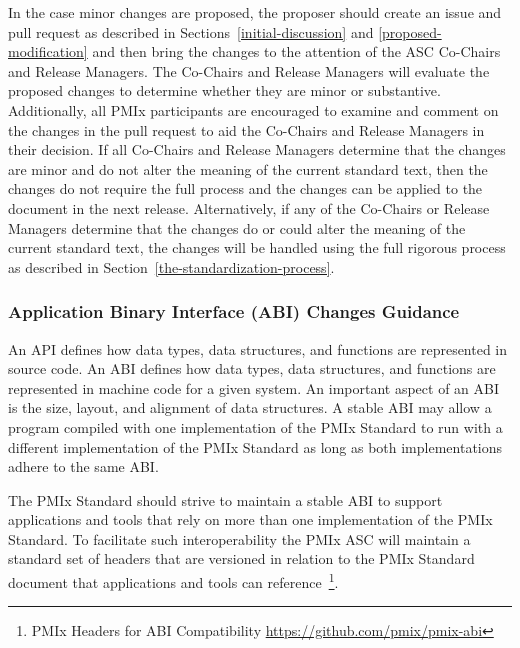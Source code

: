 \documentclass{article}
\begin{document}
In the case minor changes are proposed, the proposer should 
create an issue and pull request as described in Sections~\ref{initial-discussion}
and \ref{proposed-modification} and then bring the
changes to the attention of the ASC Co-Chairs and Release Managers.
The Co-Chairs and Release Managers will evaluate the proposed
changes to determine whether they are minor or substantive.
Additionally, all PMIx participants are encouraged to examine
and comment on the changes in the pull request to aid the
Co-Chairs and Release Managers in their decision.
If all Co-Chairs and Release Managers determine that the
changes are minor and do not alter the meaning of the current standard text, 
then the changes do not require the full process and
the changes can be applied to the document in the next release.
Alternatively, if any of the Co-Chairs or Release Managers determine 
that the changes do or could alter the meaning of the current standard text, 
the changes will be handled using the full rigorous process
as described in Section~\ref{the-standardization-process}.

\hypertarget{abi-changes-guidance}{%
\subsubsection{Application Binary Interface (ABI) Changes Guidance}%
\label{abi-changes-guidance}}

An \acf{API} defines how data types, data structures, and functions are represented in source code.
An \acf{ABI} defines how data types, data structures, and functions are represented in machine code for a given system.
An important aspect of an \ac{ABI} is the size, layout, and alignment of data structures.
A stable \ac{ABI} may allow a program compiled with one implementation of the PMIx Standard to run with a different implementation of the PMIx Standard as long as both implementations adhere to the same \ac{ABI}.

The PMIx Standard should strive to maintain a stable \ac{ABI} to support applications and tools that rely on more than one implementation of the PMIx Standard.
To facilitate such interoperability the PMIx \ac{ASC} will maintain a standard set of headers that are versioned in relation to the PMIx Standard document that applications and tools can reference~\footnote{PMIx Headers for ABI Compatibility \url{https://github.com/pmix/pmix-abi}}.
\end{document}
